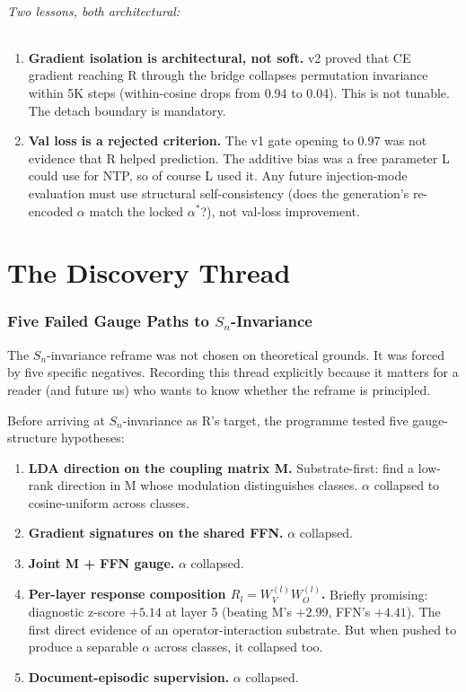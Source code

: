 \documentclass[10pt, twocolumn, a4paper]{article}
\begin{document}
\paragraph{Two lessons, both architectural:}
\begin{enumerate}[nosep,leftmargin=*]
\item \textbf{Gradient isolation is architectural, not soft.} v2 proved that CE gradient reaching R through the bridge collapses permutation invariance within 5K steps (within-cosine drops from 0.94 to 0.04). This is not tunable. The detach boundary is mandatory.
\item \textbf{Val loss is a rejected criterion.} The v1 gate opening to 0.97 was not evidence that R helped prediction. The additive bias was a free parameter L could use for NTP, so of course L used it. Any future injection-mode evaluation must use structural self-consistency (does the generation's re-encoded $\alpha$ match the locked $\alpha^*$?), not val-loss improvement.
\end{enumerate}


\part{The Discovery Thread}

\section{Five Failed Gauge Paths to $S_n$-Invariance}

The $S_n$-invariance reframe was not chosen on theoretical grounds. It was forced by five specific negatives. Recording this thread explicitly because it matters for a reader (and future us) who wants to know whether the reframe is principled.

Before arriving at $S_n$-invariance as R's target, the programme tested five gauge-structure hypotheses:

\begin{enumerate}[nosep,leftmargin=*]
\item \textbf{LDA direction on the coupling matrix M.} Substrate-first: find a low-rank direction in M whose modulation distinguishes classes. $\alpha$ collapsed to cosine-uniform across classes.
\item \textbf{Gradient signatures on the shared FFN.} $\alpha$ collapsed.
\item \textbf{Joint M + FFN gauge.} $\alpha$ collapsed.
\item \textbf{Per-layer response composition $R_l = W_V^{(l)} W_O^{(l)}$.} Briefly promising: diagnostic z-score $+5.14$ at layer 5 (beating M's $+2.99$, FFN's $+4.41$). The first direct evidence of an operator-interaction substrate. But when pushed to produce a separable $\alpha$ across classes, it collapsed too.
\item \textbf{Document-episodic supervision.} $\alpha$ collapsed.
\end{enumerate}
\end{document}
